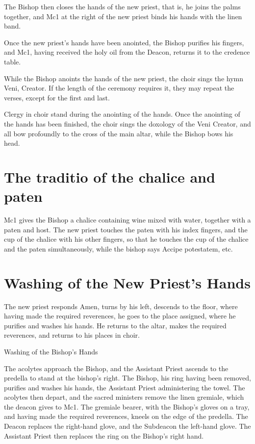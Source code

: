 \documentclass{report}
\begin{document}
{	The Bishop then closes the hands of the new priest, that is, he joins the
	palms together, and Mc1 at the right of the new priest binds his hands with
	the linen band.

	Once the new priest’s hands have been anointed, the Bishop purifies his
	fingers, and Mc1, having received the holy oil from the Deacon, returns it
	to the credence table.

	While the Bishop anoints the hands of the new priest, the choir sings the
	hymn Veni, Creator. If the length of the ceremony requires it, they may
	repeat the verses, except for the first and last.

	Clergy in choir stand during the anointing of the hands. Once the anointing
	of the hands has been finished, the choir sings the doxology of the Veni
	Creator, and all bow profoundly to the cross of the main altar, while the
	Bishop bows his head.

	\section{The traditio of the chalice and paten}

	Mc1 gives the Bishop a chalice containing wine mixed with water, together
	with a paten and host. The new priest touches the paten with his index
	fingers, and the cup of the chalice with his other fingers, so that he
	touches the cup of the chalice and the paten simultaneously, while the
	bishop says Accipe potestatem, etc.

	\section{Washing of the New Priest’s Hands}

	The new priest responds Amen, turns by his left, descends to the floor,
	where having made the required reverences, he goes to the place assigned,
	where he purifies and washes his hands. He returns to the altar, makes the
	required reverences, and returns to his places in choir.

	Washing of the Bishop’s Hands

	The acolytes approach the Bishop, and the Assistant Priest ascends to the
	predella to stand at the bishop’s right. The Bishop, his ring having been
	removed, purifies and washes his hands, the Assistant Priest administering
	the towel. The acolytes then depart, and the sacred ministers remove the
	linen gremiale, which the deacon gives to Mc1. The gremiale bearer, with
	the Bishop’s gloves on a tray, and having made the required reverences,
	kneels on the edge of the predella. The Deacon replaces the right-hand
	glove, and the Subdeacon the left-hand glove. The Assistant Priest then
	replaces the ring on the Bishop’s right hand.

}
\end{document}
